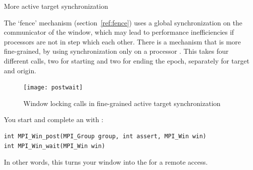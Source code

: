  {More active target synchronization}
\label{sec:ref:post-wait}

The `fence' mechanism (section~\ref{ref:fence}) uses a global synchronization on the
communicator of the window, which may 
lead to performance inefficiencies if processors are not in step which each other. 
There is a mechanism that is more fine-grained, by using synchronization only 
on a processor . This takes four different calls, two for starting
and two for ending the epoch, separately for target and origin.
\begin{figure}[ht]
  \texttt{[image: postwait]}
  \caption{Window locking calls in fine-grained active target synchronization}
  \label{fig:postwait}
\end{figure}

You start and complete an  with%
:
\begin{verbatim}
int MPI_Win_post(MPI_Group group, int assert, MPI_Win win)
int MPI_Win_wait(MPI_Win win)
\end{verbatim}
In other words, this turns your window into the  for a remote access.

